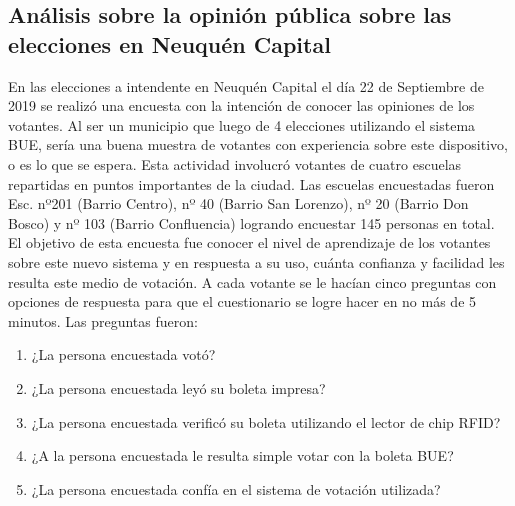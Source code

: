 \subsection{Análisis sobre la opinión pública sobre las elecciones en Neuquén Capital}
En las elecciones a intendente en Neuquén Capital el día 22 de Septiembre de 2019 se realizó una encuesta con la intención de conocer las opiniones de los votantes. Al ser un municipio que luego de 4 elecciones utilizando el sistema BUE, sería una buena muestra de votantes con experiencia sobre este dispositivo, o es lo que se espera. Esta actividad involucró votantes de cuatro escuelas repartidas en puntos importantes de la ciudad. Las escuelas encuestadas fueron Esc. nº201 (Barrio Centro), nº 40 (Barrio San Lorenzo), nº 20 (Barrio Don Bosco) y nº 103 (Barrio Confluencia) logrando encuestar 145 personas en total. \newline
El objetivo de esta encuesta fue conocer el nivel de aprendizaje de los votantes sobre este nuevo sistema y en respuesta a su uso, cuánta confianza y facilidad les resulta este medio de votación. A cada votante se le hacían cinco preguntas con opciones de respuesta para que el cuestionario se logre hacer en no más de 5 minutos. Las preguntas fueron:
\begin{enumerate}
    \item ¿La persona encuestada votó?
    \item ¿La persona encuestada leyó su boleta impresa?
    \item ¿La persona encuestada verificó su boleta utilizando el lector de chip RFID?
    \item ¿A la persona encuestada le resulta simple votar con la boleta BUE?
    \item ¿La persona encuestada confía en el sistema de votación utilizada?
\end{enumerate}

